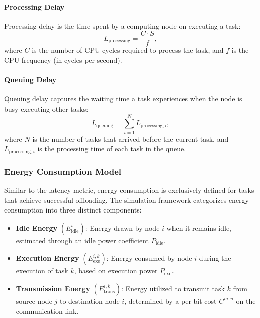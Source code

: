 \documentclass{svproc}
\begin{document}
\paragraph{Processing Delay}
Processing delay is the time spent by a computing node on executing a task:
\begin{equation}
L_{\text{processing}} = \frac{C \cdot S}{f},
\end{equation}
where \( C \) is the number of CPU cycles required to process the task, and \( f \) is the CPU frequency (in cycles per second).

\paragraph{Queuing Delay}
Queuing delay captures the waiting time a task experiences when the node is busy executing other tasks:
\begin{equation}
L_{\text{queuing}} = \sum_{i=1}^{N} L_{\text{processing}, i},
\end{equation}
where \( N \) is the number of tasks that arrived before the current task, and \( L_{\text{processing}, i} \) is the processing time of each task in the queue.

\subsubsection{Energy Consumption Model}\label{subsec:energy_consumption}

Similar to the latency metric, energy consumption is exclusively defined for tasks that achieve successful offloading. The simulation framework categorizes energy consumption into three distinct components:

\begin{itemize}
    \item \textbf{Idle Energy} $(E_{\text{idle}}^{i})$: Energy drawn by node $i$ when it remains idle, estimated through an idle power coefficient $P_{\text{idle}}$.
    \item \textbf{Execution Energy} $(E_{\text{exe}}^{i,k})$: Energy consumed by node $i$ during the execution of task $k$, based on execution power $P_{\text{exe}}$.
    \item \textbf{Transmission Energy} $(E_{\text{trans}}^{i,k})$: Energy utilized to transmit task $k$ from source node $j$ to destination node $i$, determined by a per-bit cost $C^{m,n}$ on the communication link.
\end{itemize}
\end{document}
